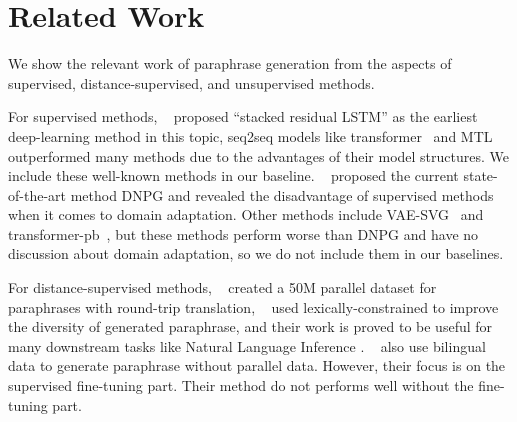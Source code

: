 \section{Related Work}
We show the relevant work of paraphrase generation from the aspects of supervised, distance-supervised, and unsupervised methods.

For supervised methods, \citeauthor{prakash2016neural}~ proposed ``stacked residual LSTM'' as the earliest deep-learning method in this topic, seq2seq models like transformer~\cite{vaswani2017attention} and MTL~\cite{domhan2017using} outperformed many methods due to the advantages of their model structures. We include these well-known methods in our baseline.  \citeauthor{li2019decomposable}~ proposed the current state-of-the-art method DNPG and revealed the disadvantage of supervised methods when it comes to domain adaptation.  Other methods include VAE-SVG~\cite{gupta2018deep} and transformer-pb~\cite{wang2019task}, but these methods perform worse than DNPG and have no discussion about domain adaptation, so we do not include them in our baselines.

For distance-supervised methods, \citeauthor{wieting2017paranmt}~ created a 50M parallel dataset for paraphrases with round-trip translation, \citeauthor{hu2019parabank}~ used lexically-constrained to improve the diversity of generated paraphrase, and their work is proved to be useful for many downstream tasks like Natural Language Inference \cite{hu2019improved}. \citeauthor{liu2020exploring}~ also use bilingual data to generate paraphrase without parallel data. However, their focus is on the supervised fine-tuning part. Their method do not performs well without the fine-tuning part.

